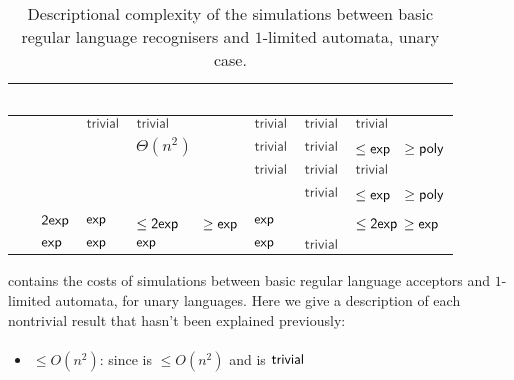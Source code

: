 \begin{table}
	\centering
	\renewcommand{\arraystretch}{1.2}
	\renewcommand{\hstdef}{.55}
	\begin{tabular}{|l|l|l|p{4.3em}|l|l|p{3.1em}|}
		\hline
		~     & \ODFA           & \ONFA           & \TDFA                                            & \TNFA     & \OLA      & \ODLA                          \\ \hline
		\ODFA & \cY             & $\Cctriv$       & $\Cctriv$                                        & $\Cctriv$ & $\Cctriv$ & $\Cctriv$                      \\ \hline
		\ONFA & \rbt{$\CsubEq$} & \cY             & \cR $\Theta(n^2)$                                & $\Cctriv$ & $\Cctriv$ & \cB $\le\Cexp\hst$ $\ge\Cpoly$ \\ \hline
		\TDFA & \rbt{$\CsubEq$} & \rbt{$\CsubEq$} & \cY                                              & $\Cctriv$ & $\Cctriv$ & $\Cctriv$                      \\ \hline
		\TNFA & \rbt{$\CsubEq$} & \rbt{$\CsubEq$} & \cR \rbt[.4]{$\le\Csubln$} \rbt[.3]{$\ge\Cpoly$} & \cY       & $\Cctriv$ & \cB $\le\Cexp\hst$ $\ge\Cpoly$ \\ \hline
		\OLA  & $\Cdexp$        & $\Cexp$         & \cG $\le\Cdexp\hst[1.25]$ $\ge\Cexp$             & $\Cexp$   & \cY       & \cG $\le\Cdexp$ $\ge\Cexp$     \\ \hline
		\ODLA & $\Cexp$         & $\Cexp$         & $\Cexp$                                          & $\Cexp$   & $\Cctriv$ & \cY                            \\ \hline
	\end{tabular}
	\caption{Descriptional complexity of the simulations between basic regular language recognisers and $1$-limited automata, unary case.}
	\label{tab:sims-1la-unary}
\end{table}

 contains the costs of simulations between basic regular language acceptors and $1$-limited automata, for unary languages.
Here we give a description of each nontrivial result that hasn't been explained previously:

\paragraph{\ONFA{}\tto\ODLA}\label{cost:1NFAto1DLAu}
\begin{itemize}
	\item $\le O(n^2)$: since \hyperref[cost:1NFAto2DFAu]{\ONFA{}\tto\TDFA} is $\le O(n^2)$ and \TDFA{}\tto\ODLA is $\Ctriv$
\end{itemize}
